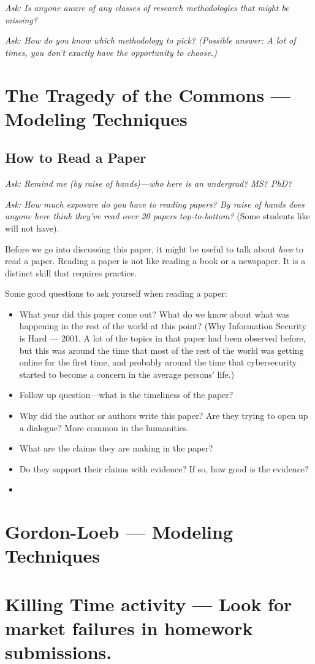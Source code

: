 \documentclass[11pt]{article}
\begin{document}
{\it Ask: Is anyone aware of any classes of research methodologies that might be missing? }

{\it Ask: How do you know which methodology to pick? (Possible answer: A lot of times, you don't exactly have the opportunity to choose.)}




\section{The Tragedy of the Commons --- Modeling Techniques}

\subsection{How to Read a Paper}

{\it Ask: Remind me (by raise of hands)---who here is an undergrad? MS? PhD?}

{\it Ask: How much exposure do you have to reading papers? By raise of hands does anyone here think they've read over 20 papers top-to-bottom?} (Some students like will not have).

Before we go into discussing this paper, it might be useful to talk about {\it how} to read a paper. Reading a paper is not like reading a book or a newspaper. It is a distinct skill that requires practice.

Some good questions to ask yourself when reading a paper:

\begin{itemize}
    \item What year did this paper come out? What do we know about what was happening in the rest of the world at this point? (Why Information Security is Hard --- 2001. A lot of the topics in that paper had been observed before, but this was around the time that most of the rest of the world was getting online for the first time, and probably around the time that cybersecurity started to become a concern in the average persons' life.)
    \item Follow up question---what is the timeliness of the paper?
    \item Why did the author or authors write this paper? Are they trying to open up a dialogue? More common in the humanities.
    \item What are the claims they are making in the paper?
    \item Do they support their claims with evidence? If so, how good is the evidence?
    \item 
\end{itemize}


\section{Gordon-Loeb --- Modeling Techniques}


\section{Killing Time activity --- Look for market failures in homework submissions.}
\end{document}
